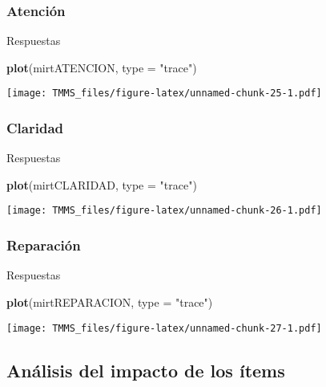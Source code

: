 \documentclass[
  10pt,
  spanish,
]{article}
\newenvironment{Shaded}{\begin{snugshade}}{\end{snugshade}}
\newcommand{\DataTypeTok}[1]{\textcolor[rgb]{0.13,0.29,0.53}{#1}}
\newcommand{\KeywordTok}[1]{\textcolor[rgb]{0.13,0.29,0.53}{\textbf{#1}}}
\newcommand{\NormalTok}[1]{#1}
\newcommand{\StringTok}[1]{\textcolor[rgb]{0.31,0.60,0.02}{#1}}
\begin{document}
\hypertarget{atenciuxf3n-2}{%
\subsubsection{Atención}\label{atenciuxf3n-2}}

Respuestas

\begin{Shaded}
\begin{Highlighting}[]
\KeywordTok{plot}\NormalTok{(mirtATENCION, }\DataTypeTok{type =} \StringTok{"trace"}\NormalTok{)}
\end{Highlighting}
\end{Shaded}

\texttt{[image: TMMS\_files/figure-latex/unnamed-chunk-25-1.pdf]}

\hypertarget{claridad-3}{%
\subsubsection{Claridad}\label{claridad-3}}

Respuestas

\begin{Shaded}
\begin{Highlighting}[]
\KeywordTok{plot}\NormalTok{(mirtCLARIDAD, }\DataTypeTok{type =} \StringTok{"trace"}\NormalTok{)}
\end{Highlighting}
\end{Shaded}

\texttt{[image: TMMS\_files/figure-latex/unnamed-chunk-26-1.pdf]}

\hypertarget{reparaciuxf3n-2}{%
\subsubsection{Reparación}\label{reparaciuxf3n-2}}

Respuestas

\begin{Shaded}
\begin{Highlighting}[]
\KeywordTok{plot}\NormalTok{(mirtREPARACION, }\DataTypeTok{type =} \StringTok{"trace"}\NormalTok{)}
\end{Highlighting}
\end{Shaded}

\texttt{[image: TMMS\_files/figure-latex/unnamed-chunk-27-1.pdf]}

\hypertarget{anuxe1lisis-del-impacto-de-los-uxedtems}{%
\subsection{Análisis del impacto de los
ítems}\label{anuxe1lisis-del-impacto-de-los-uxedtems}}
\end{document}
